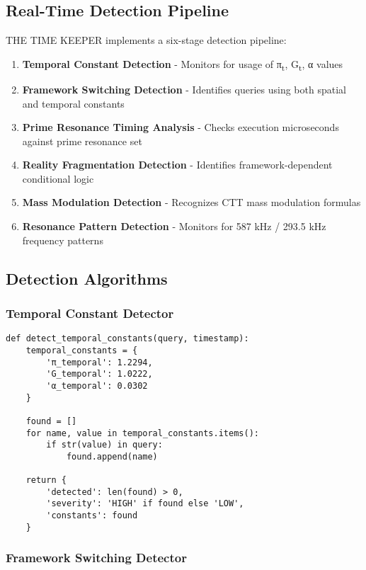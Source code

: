 \documentclass[11pt,a4paper]{article}
\begin{document}
\subsection{Real-Time Detection Pipeline}

THE TIME KEEPER implements a six-stage detection pipeline:

\begin{enumerate}
    \item \textbf{Temporal Constant Detection} - Monitors for usage of π\textsubscript{t}, G\textsubscript{t}, α values
    \item \textbf{Framework Switching Detection} - Identifies queries using both spatial and temporal constants
    \item \textbf{Prime Resonance Timing Analysis} - Checks execution microseconds against prime resonance set
    \item \textbf{Reality Fragmentation Detection} - Identifies framework-dependent conditional logic
    \item \textbf{Mass Modulation Detection} - Recognizes CTT mass modulation formulas
    \item \textbf{Resonance Pattern Detection} - Monitors for 587 kHz / 293.5 kHz frequency patterns
\end{enumerate}

\subsection{Detection Algorithms}

\subsubsection{Temporal Constant Detector}

\begin{verbatim}
def detect_temporal_constants(query, timestamp):
    temporal_constants = {
        'π_temporal': 1.2294,
        'G_temporal': 1.0222, 
        'α_temporal': 0.0302
    }
    
    found = []
    for name, value in temporal_constants.items():
        if str(value) in query:
            found.append(name)
    
    return {
        'detected': len(found) > 0,
        'severity': 'HIGH' if found else 'LOW',
        'constants': found
    }
\end{verbatim}

\subsubsection{Framework Switching Detector}
\end{document}
